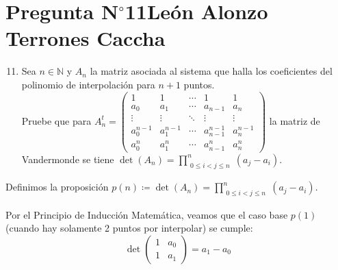 \section{Pregunta N$^{\circ}$11\qquad León Alonzo Terrones Caccha}



\begin{frame}
	\begin{enumerate}\setcounter{enumi}{10}
		\item

		    Sea $n\in \mathbb{N}$ y $A_n$ la matriz asociada al sistema que halla los coeficientes del polinomio de interpolación para $n+1$ puntos. \\Pruebe que para $A^{t}_{n}=\begin{pmatrix} 1&1&\cdots & 1 &1\\a_0&a_1&\cdots &a_{n-1}&a_{n}\\\vdots&\vdots&\ddots&\vdots&\vdots\\a_0^{n-1}&a_1^{n-1}&\cdots&a_{n-1}^{n-1}& a_{n}^{n-1}\\a_0^{n}&a_1^{n}&\cdots&a_{n-1}^{n}&a_{n}^{n}\end{pmatrix}$ la matriz de Vandermonde se
		      tiene
		      \begin{math}
			      \det\left(A_{n}\right)=
			      \prod\limits_{\substack{0\leq i< j\leq n}}^{n}
			      \left(a_{j}-a_{i}\right)
		      \end{math}.
	\end{enumerate}

	\begin{solution}

		Definimos la proposición
		\begin{math}
			p\left(n\right)\coloneqq
			\det\left(A_{n}\right)=
			      \prod\limits_{\substack{0\leq i< j\leq n}}^{n}
			      \left(a_{j}-a_{i}\right)
		\end{math}.

		Por el \alert{Principio de Inducción Matemática}, veamos que
		el caso base $p\left(1\right)$(cuando hay solamente 2 puntos por interpolar) se cumple:
	\begin{equation*}
	    \det\begin{pmatrix} 
            1&a_0\\
            1&a_1\end{pmatrix}=a_1-a_0
	\end{equation*}


\end{solution}
\end{frame}
